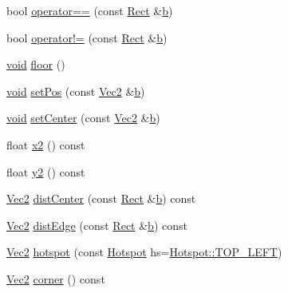 \begin{DoxyCompactItemize}
\item 
bool \hyperlink{class_rect_afaf8264526309e7e7a298acbe9712b74}{operator==} (const \hyperlink{class_rect}{Rect} \&\hyperlink{_s_d_l__opengl__glext_8h_a0f71581a41fd2264c8944126dabbd010}{b})
\item 
bool \hyperlink{class_rect_ac04dface18d50b0d05c9b86e8e220dd9}{operator!=} (const \hyperlink{class_rect}{Rect} \&\hyperlink{_s_d_l__opengl__glext_8h_a0f71581a41fd2264c8944126dabbd010}{b})
\item 
\hyperlink{_s_d_l__opengles2__gl2ext_8h_ae5d8fa23ad07c48bb609509eae494c95}{void} \hyperlink{class_rect_a22c5597a421f4cb20b54d24d08772afd}{floor} ()
\item 
\hyperlink{_s_d_l__opengles2__gl2ext_8h_ae5d8fa23ad07c48bb609509eae494c95}{void} \hyperlink{class_rect_a378200dee7103a9076dfd446fbb1a6b2}{set\-Pos} (const \hyperlink{class_vec2}{Vec2} \&\hyperlink{_s_d_l__opengl__glext_8h_a0f71581a41fd2264c8944126dabbd010}{b})
\item 
\hyperlink{_s_d_l__opengles2__gl2ext_8h_ae5d8fa23ad07c48bb609509eae494c95}{void} \hyperlink{class_rect_a1b2f9aad990e464a36d4689c5a29a6ee}{set\-Center} (const \hyperlink{class_vec2}{Vec2} \&\hyperlink{_s_d_l__opengl__glext_8h_a0f71581a41fd2264c8944126dabbd010}{b})
\item 
float \hyperlink{class_rect_aee4768286ca2274cbc4de2fa80dbd3fb}{x2} () const 
\item 
float \hyperlink{class_rect_acc34223c8d8390cb48a48780c7e4feb2}{y2} () const 
\item 
\hyperlink{class_vec2}{Vec2} \hyperlink{class_rect_a94aebe6039073b116e43070dd999a3c0}{dist\-Center} (const \hyperlink{class_rect}{Rect} \&\hyperlink{_s_d_l__opengl__glext_8h_a0f71581a41fd2264c8944126dabbd010}{b}) const 
\item 
\hyperlink{class_vec2}{Vec2} \hyperlink{class_rect_a9002b79ee8a8a7cffc60fc1d5d135469}{dist\-Edge} (const \hyperlink{class_rect}{Rect} \&\hyperlink{_s_d_l__opengl__glext_8h_a0f71581a41fd2264c8944126dabbd010}{b}) const 
\item 
\hyperlink{class_vec2}{Vec2} \hyperlink{class_rect_ab75cc4e7ae7bb66cbdb4f3e1865aa9db}{hotspot} (const \hyperlink{common_8hpp_aaa588ba8f99807e02a59c99df80af509}{Hotspot} hs=\hyperlink{common_8hpp_aaa588ba8f99807e02a59c99df80af509a6b4ed010af97f067c8ba669e400f3f93}{Hotspot\-::\-T\-O\-P\-\_\-\-L\-E\-F\-T})
\item 
\hyperlink{class_vec2}{Vec2} \hyperlink{class_rect_aebfed9a5a7fdebdef9a6bc2763db7b9e}{corner} () const 
\item 

\end{DoxyCompactItemize}
